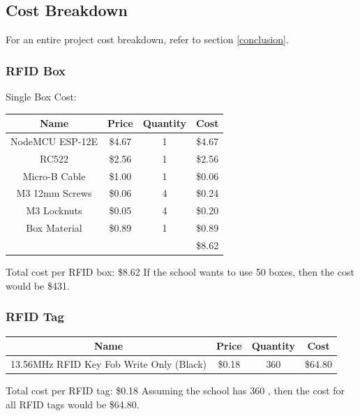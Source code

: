 \documentclass[12pt]{article}
\begin{document}
\begin{spacing}{1.2}
\subsection{Cost Breakdown}
For an entire project cost breakdown, refer to section \ref{conclusion}.

\subsubsection{RFID Box}

Single Box Cost:
\begin{center}
\begin{tabular}{ |c | c | c | c|}

\hline
Name & Price & Quantity & Cost\\
\hline \hline
NodeMCU ESP-12E & \$4.67 & 1 & \$4.67 \\
\hline
RC522 & \$2.56 & 1 & \$2.56 \\
\hline
Micro-B Cable & \$1.00 & 1 & \$0.06 \\ 
\hline
M3 12mm Screws & \$0.06 & 4 & \$0.24 \\ 
\hline
M3 Locknuts & \$0.05 & 4 & \$0.20 \\ 
\hline
Box Material & \$0.89 & 1 & \$0.89 \\
\hline
&&&\$8.62 \\
\hline
\end{tabular}
\end{center}

Total cost per RFID box: \$8.62
\newline
If the school wants to use 50 boxes, then the cost would be \$431.

\subsubsection{RFID Tag}

\label{RFIDTagsCost}
\begin{center}
\begin{tabular}{ |c | c | c | c| }

\hline
Name & Price & Quantity & Cost\\
\hline \hline
13.56MHz  RFID Key Fob Write Only (Black) & \$0.18 & 360 & \$64.80 \\
\hline
\end{tabular}
\end{center}

Total cost per RFID tag: \$0.18
\newline
Assuming the school has 360 , then the cost for all RFID tags would be \$64.80.


\end{spacing}
\end{document}
